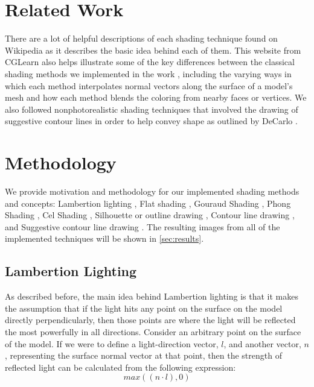 \documentclass[10pt,twocolumn,letterpaper]{article}
\begin{document}
\section{Related Work}
\label{sec:related}

There are a lot of helpful descriptions of each shading technique found on Wikipedia \cite{wiki:List_of_common_shading_algorithms} as it describes the basic idea behind each of them. This website from CGLearn also helps illustrate some of the key differences between the classical shading methods we implemented in the work \cite{cglearn}, including the varying ways in which each method interpolates normal vectors along the surface of a model's mesh and how each method blends the coloring from nearby faces or vertices. We also followed nonphotorealistic shading techniques that involved the drawing of suggestive contour lines in order to help convey shape as outlined by DeCarlo \etal\cite{DeCarlo:2003:SCF}.

\section{Methodology}
\label{sec:methodology}

We provide motivation and methodology for our implemented shading methods and concepts: Lambertion lighting \cite{wiki:Lambertian_reflectance}, Flat shading \cite{wiki:Shading}, Gouraud Shading \cite{wiki:Shading}, Phong Shading \cite{wiki:Shading}, Cel Shading \cite{wiki:Cel_shading}, Silhouette or outline drawing \cite{wiki:Cel_shading}, Contour line drawing \cite{DeCarlo:2003:SCF}, and Suggestive contour line drawing \cite{DeCarlo:2003:SCF}. The resulting images from all of the implemented techniques will be shown in \cref{sec:results}.

\subsection{Lambertion Lighting}

As described before, the main idea behind Lambertion lighting \cite{wiki:Lambertian_reflectance} is that it makes the assumption that if the light hits any point on the surface on the model directly perpendicularly, then those points are where the light will be reflected the most powerfully in all directions. Consider an arbitrary point on the surface of the model. If we were to define a light-direction vector, $l$, and another vector, $n$, representing the surface normal vector at that point, then the strength of reflected light can be calculated from the following expression:
\begin{equation}
    max((n \cdot l), 0)
    \label{eq:lambert}
\end{equation}
\end{document}
